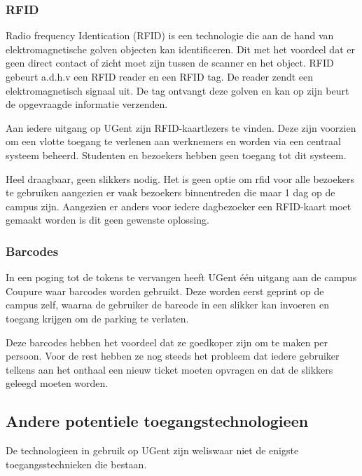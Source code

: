 \subsubsection{RFID}

Radio frequency Identication (RFID) is een technologie die aan de hand van elektromagnetische golven objecten kan identificeren. Dit met het voordeel dat er geen direct contact of zicht moet zijn tussen de scanner en het object. RFID gebeurt a.d.h.v een RFID reader en een RFID tag. De reader zendt een elektromagnetisch signaal uit. De tag ontvangt deze golven en kan op zijn beurt de opgevraagde informatie verzenden. \autocite{li2009design}

Aan iedere uitgang op UGent zijn RFID-kaartlezers te vinden. Deze zijn voorzien om een vlotte toegang te verlenen aan werknemers en worden via een centraal systeem beheerd. Studenten en bezoekers hebben geen toegang tot dit systeem.

Heel draagbaar, geen slikkers nodig.
Het is geen optie om rfid voor alle bezoekers te gebruiken aangezien er vaak bezoekers binnentreden die maar 1 dag op de campus zijn. Aangezien er anders voor iedere dagbezoeker een RFID-kaart moet gemaakt worden is dit geen gewenste oplossing.

\subsubsection{Barcodes}
In een poging tot de tokens te vervangen heeft UGent één uitgang aan de campus Coupure waar barcodes worden gebruikt. Deze worden eerst geprint op de campus zelf, waarna de gebruiker de barcode in een slikker kan invoeren en toegang krijgen om de parking te verlaten.

Deze barcodes hebben het voordeel dat ze goedkoper zijn om te maken per persoon. Voor de rest hebben ze nog steeds het probleem dat iedere gebruiker telkens aan het onthaal een nieuw ticket moeten opvragen en dat de slikkers geleegd moeten worden.

\subsection{Andere potentiele toegangstechnologieen}
De technologieen in gebruik op UGent zijn weliswaar niet de enigste toegangsstechnieken die bestaan.

